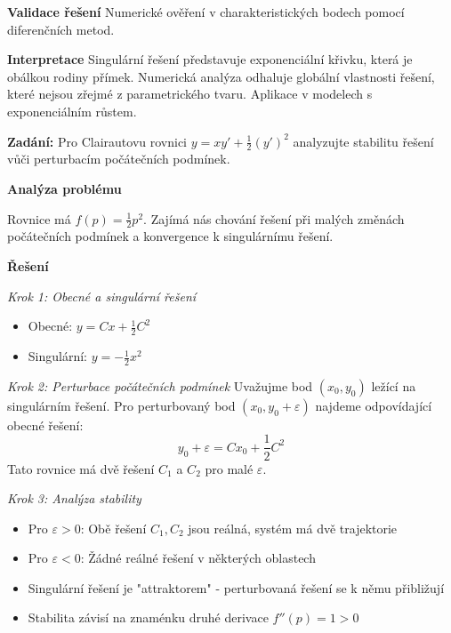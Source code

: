 \begin{example}
\vspace{1.5\baselineskip}

\noindent\textbf{Validace řešení}
Numerické ověření v charakteristických bodech pomocí diferenčních metod.

\vspace{1.5\baselineskip}

\noindent\textbf{Interpretace}
Singulární řešení představuje exponenciální křivku, která je obálkou rodiny přímek. Numerická analýza odhaluje globální vlastnosti řešení, které nejsou zřejmé z parametrického tvaru. Aplikace v modelech s exponenciálním růstem.

\end{example}

\begin{example}
\label{ex:stabilita-analyza}

\noindent\textbf{Zadání:} Pro Clairautovu rovnici $y = xy' + \frac{1}{2}(y')^2$ analyzujte stabilitu řešení vůči perturbacím počátečních podmínek.

\vspace{1.5\baselineskip}

\noindent\textbf{Analýza problému}

Rovnice má $f(p) = \frac{1}{2}p^2$. Zajímá nás chování řešení při malých změnách počátečních podmínek a konvergence k singulárnímu řešení.

\vspace{1.5\baselineskip}

\noindent\textbf{Řešení}

\noindent\textit{Krok 1: Obecné a singulární řešení}
\begin{itemize}
\item Obecné: $y = Cx + \frac{1}{2}C^2$
\item Singulární: $y = -\frac{1}{2}x^2$
\end{itemize}

\vspace{1\baselineskip}

\noindent\textit{Krok 2: Perturbace počátečních podmínek}
Uvažujme bod $(x_0, y_0)$ ležící na singulárním řešení. Pro perturbovaný bod $(x_0, y_0 + \varepsilon)$ najdeme odpovídající obecné řešení:
\[
y_0 + \varepsilon = Cx_0 + \frac{1}{2}C^2
\]
Tato rovnice má dvě řešení $C_1$ a $C_2$ pro malé $\varepsilon$.

\vspace{1\baselineskip}

\noindent\textit{Krok 3: Analýza stability}
\begin{itemize}
\item Pro $\varepsilon > 0$: Obě řešení $C_1, C_2$ jsou reálná, systém má dvě trajektorie
\item Pro $\varepsilon < 0$: Žádné reálné řešení v některých oblastech
\item Singulární řešení je "attraktorem" - perturbovaná řešení se k němu přibližují
\item Stabilita závisí na znaménku druhé derivace $f''(p) = 1 > 0$
\end{itemize}


\end{example}
